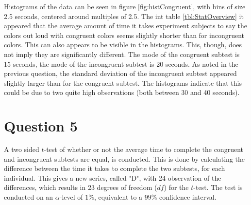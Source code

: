 \documentclass[12pt]{article}
\begin{document}
\begin{figure}[ht]
\centering
\caption{Histograms of datasets}
\label{fig:histCongruent}
\begin{subfigure}{0.45\textwidth}
	\centering
\end{subfigure}
\hfill
\begin{subfigure}{0.45\textwidth}
	\centering
\end{subfigure}
\end{figure}

Histograms of the data can be seen in figure \ref{fig:histCongruent}, with bins of size 2.5 seconds, centered around multiples of 2.5. The int table \ref{tbl:StatOverview} it appeared that the average amount of time it takes experiment subjects to say the colors out loud with congruent colors seems slightly shorter than for incongruent colors. This can also appears to be visible in the histograms. This, though, does not imply they are significantly different.
The mode of the congruent subtest is 15 seconds, the mode of the incongruent subtest is 20 seconds.
\newline
As noted in the previous question, the standard deviation of the incongruent subtest appeared slightly larger than for the congruent subtest. The histograms indicate that this could be due to two quite high observations (both between 30 and 40 seconds).


\section{Question 5}
A two sided $t$-test of whether or not the average time to complete the congruent and incongruent subtests are equal, is conducted. This is done by calculating the difference between the time it takes to complete the two subtests, for each individual. This gives a new series, called "D", with 24 observation of the differences, which results in 23 degrees of freedom ($df$) for the $t$-test. The test is conducted on an $\alpha$-level of $1\%$, equivalent to a $99\%$ confidence interval.
\end{document}

